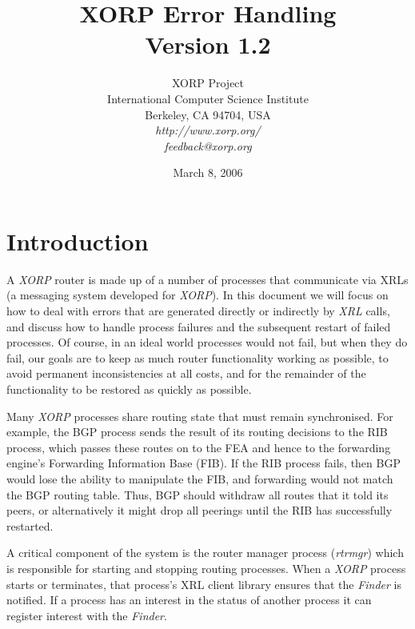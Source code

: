 \documentclass[11pt]{article}
\makeatletter
\newcommand{\xorp} {{\em XORP}\@\xspace}
\newcommand{\finder} {{\em Finder}\@\xspace}
\newcommand{\xrl} {{\em XRL}\@\xspace}
\newcommand{\rtrmgr} {{\em rtrmgr}\@\xspace}
\makeatother
\begin{document}
\title{XORP Error Handling \\
\vspace{1ex}
Version 1.2}
\author{ XORP Project					\\
	 International Computer Science Institute	\\
	 Berkeley, CA 94704, USA			\\
         {\it http://www.xorp.org/}			\\
	 {\it feedback@xorp.org}
}
\date{March 8, 2006}

\maketitle

\thispagestyle{empty}


\section{Introduction}

A \xorp router is made up of a number of processes that communicate
via XRLs \cite{xorp:xrl} (a messaging system developed for \xorp). In
this document we will focus on how to deal with errors that are
generated directly or indirectly by \xrl calls, and discuss how to
handle process failures and the subsequent restart of failed
processes.  Of course, in an ideal world processes would not fail, but
when they do fail, our goals are to keep as much router
functionality working as possible, to avoid permanent inconsistencies
at all costs, and for the remainder of the functionality to be
restored as quickly as possible.

Many \xorp processes share routing state that must remain
synchronised. For example, the BGP process sends the result of its
routing decisions to the RIB process, which passes these routes on to
the FEA and hence to the forwarding engine's Forwarding Information
Base (FIB). If the RIB process fails, then BGP would lose the ability
to manipulate the FIB, and forwarding would not match the BGP routing
table.  Thus, BGP should withdraw all routes that it told its peers, or
alternatively it might drop all peerings until the RIB has
successfully restarted.

A critical component of the system is the router manager process
(\rtrmgr) which is responsible for starting and stopping routing
processes. When a \xorp process starts or terminates, that
process's XRL client library ensures that the \finder is notified. If
a process has an interest in the status of another process it can
register interest with the \finder.
\end{document}
